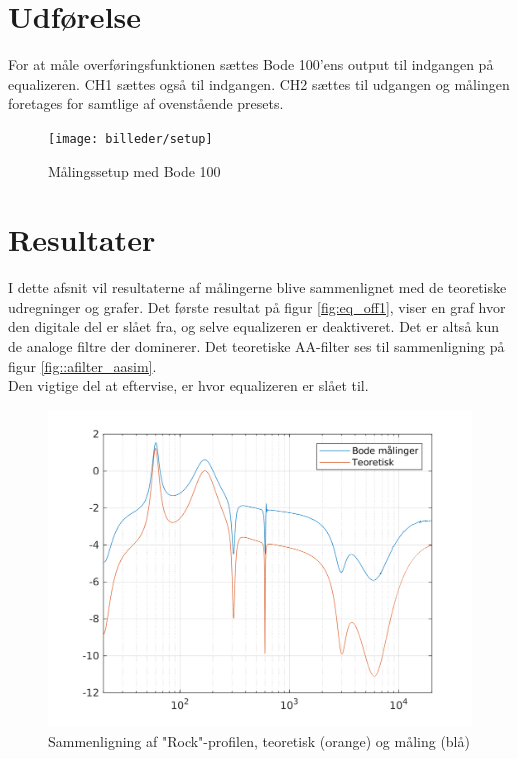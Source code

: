 \section{Udførelse}
For at måle overføringsfunktionen sættes Bode 100'ens output til indgangen på equalizeren. CH1 sættes også til indgangen. CH2 sættes til udgangen og målingen foretages for samtlige af ovenstående presets.


\begin{figure}[h!]
	\centering
	\texttt{[image: billeder/setup]}
	\caption{Målingssetup med Bode 100}
\end{figure}	


\section{Resultater}
I dette afsnit vil resultaterne af målingerne blive sammenlignet med de teoretiske udregninger og grafer.
Det første resultat på figur \ref{fig:eq_off1}, viser en graf hvor den digitale del er slået fra, og selve equalizeren er deaktiveret. Det er altså kun de analoge filtre der dominerer. Det teoretiske AA-filter ses til sammenligning på figur \ref{fig::afilter_aasim}. \\
Den vigtige del at eftervise, er hvor equalizeren er slået til. 








\begin{figure}[h!]
	\centering
	\includegraphics[width=15cm]{billeder/rock_test}
	\caption{Sammenligning af "Rock"-profilen, teoretisk (orange) og måling (blå)}
	\label{fig:rock_test}
\end{figure}
	

